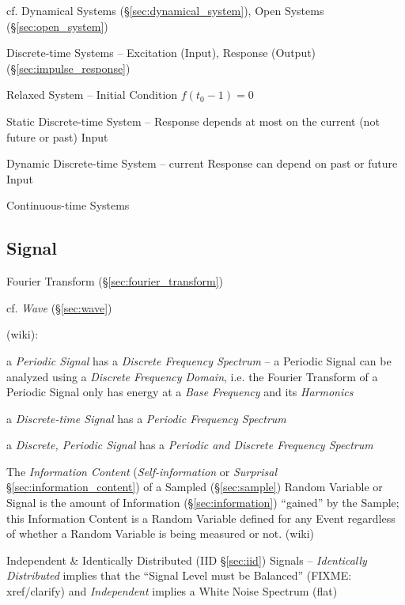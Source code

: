\fist cf. Dynamical Systems (\S\ref{sec:dynamical_system}), Open Systems
(\S\ref{sec:open_system})


Discrete-time Systems -- Excitation (Input), Response (Output)
(\S\ref{sec:impulse_response})

Relaxed System -- Initial Condition $f(t_0-1) = 0$

Static Discrete-time System -- Response depends at most on the current (not
future or past) Input

Dynamic Discrete-time System -- current Response can depend on past or future
Input

Continuous-time Systems



\subsection{Signal}\label{sec:signal}

\fist Fourier Transform (\S\ref{sec:fourier_transform})

cf. \emph{Wave} (\S\ref{sec:wave})

(wiki):

a \emph{Periodic Signal} has a \emph{Discrete Frequency Spectrum} -- a Periodic
Signal can be analyzed using a \emph{Discrete Frequency Domain}, i.e. the
Fourier Transform of a Periodic Signal only has energy at a \emph{Base
  Frequency} and its \emph{Harmonics}

a \emph{Discrete-time Signal} has a \emph{Periodic Frequency Spectrum}

a \emph{Discrete, Periodic Signal} has a \emph{Periodic and Discrete Frequency
  Spectrum}

The \emph{Information Content} (\emph{Self-information} or \emph{Surprisal}
\S\ref{sec:information_content}) of a Sampled (\S\ref{sec:sample}) Random
Variable or Signal is the amount of Information (\S\ref{sec:information})
``gained'' by the Sample; this Information Content is a Random Variable defined
for any Event regardless of whether a Random Variable is being measured or not.
(wiki)

Independent \& Identically Distributed (IID \S\ref{sec:iid}) Signals --
\emph{Identically Distributed} implies that the ``Signal Level must be
Balanced'' (FIXME: xref/clarify) and \emph{Independent} implies a White Noise
Spectrum (flat)

